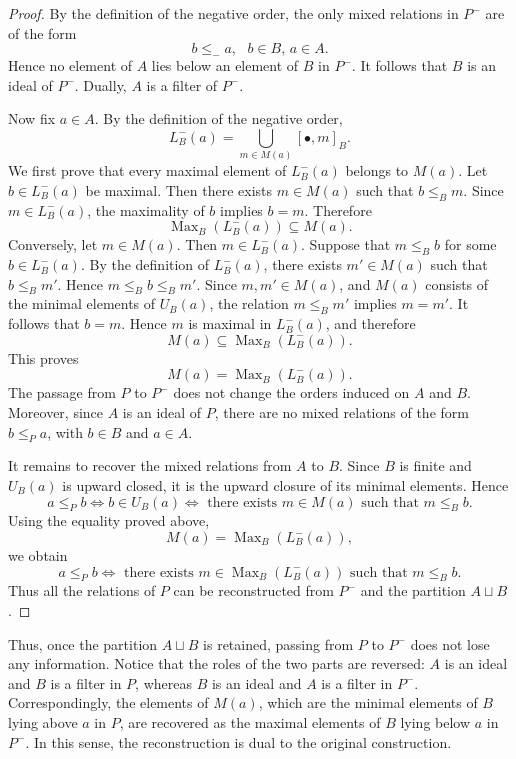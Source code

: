 \begin{proof}
By the definition of the negative order, the only mixed relations in $P^-$ are of the form \[b \leq_-a, \,\,\,\, b \in B, \, a \in A.\]
Hence no element of $A$ lies below an element of $B$ in $P^-$. It follows that $B$ is an ideal of $P^-$. Dually, $A$ is a filter of $P^-$.

Now fix $a \in A$. By the definition of the negative order, \[L^-_B(a)= \bigcup_{m \in M(a)}[\bullet,m]_B.\]
    We first prove that every maximal element of $L^-_B(a)$ belongs to $M(a)$. Let $b\in L_B^-(a)$ be maximal. Then there exists $m \in M(a)$ such that $b \leq_Bm$. Since $m \in L_B^-(a)$, the maximality of $b$ implies $b=m$. Therefore
    \[\operatorname{Max}_B(L^-_B(a)) \subseteq M(a).\] Conversely, let $m \in M(a)$. Then $m \in L_B^-(a)$. Suppose that $m \leq_Bb$ for some $b \in L_B^-(a)$. By the definition of $L^-_B(a)$, there exists $m' \in M(a)$ such that $b\leq_B m'$. Hence $m \leq_Bb\leq_Bm'.$ Since $m,m' \in M(a)$, and $M(a)$ consists of the minimal elements of $U_B(a)$, the relation $m \leq_Bm'$ implies $m=m'$. It follows that $b=m$. Hence $m$ is maximal in $L^-_B(a)$, and therefore \[M(a) \subseteq \operatorname{Max}_B(L_B^-(a)).\]
    This proves \[M(a)=\operatorname{Max}_B(L^-_B(a)).\]
    The passage from $P$ to $P^-$ does not change the orders induced on $A$ and $B$. Moreover, since $A$ is an ideal of $P$, there are no mixed relations of the form $b \leq_Pa$, with $b \in B$ and $a \in A$.

    It remains to recover the mixed relations from $A$ to $B$. Since $B$ is finite and $U_B(a)$ is upward closed, it is the upward closure of its minimal elements. Hence
    \[a \leq_Pb \iff b \in U_B(a) \iff \text{ there exists } m \in M(a) \text{ such that } m\leq_Bb.\]
    Using the equality proved above, \[M(a)=\operatorname{Max}_B(L_B^-(a)),\] we obtain  
    \[a \leq_Pb \iff \text{ there exists } m \in \operatorname{Max}_B(L^-_B(a)) \text{ such that } m \leq_B b.\]
    Thus all the relations of $P$ can be reconstructed from $P^-$ and the partition $A \sqcup B$.
\end{proof}

Thus, once the partition $A \sqcup B$ is retained, passing from $P$ to $P^-$ does not lose any information. Notice that the roles of the two parts are reversed: $A$ is an ideal and $B$ is a filter in $P$, whereas $B$ is an ideal and $A$ is a filter in $P^-$. Correspondingly, the elements of $M(a)$, which are the minimal elements of $B$ lying above $a$ in $P$, are recovered as the maximal elements of $B$ lying below $a$ in $P^-$. In this sense, the reconstruction is dual to the original construction.

